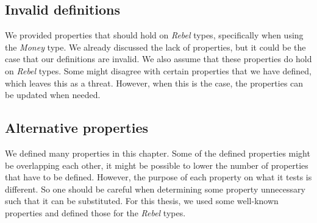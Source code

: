 \subsection*{Invalid definitions}
We provided properties that should hold on \textit{Rebel} types, specifically
when using the \textit{Money} type. We already discussed the lack of properties,
but it could be the case that our definitions are invalid. We also assume that
these properties do hold on \textit{Rebel} types. Some might disagree with
certain properties that we have defined, which leaves this as a threat. However,
when this is the case, the properties can be updated when needed.

\subsection*{Alternative properties}
We defined many properties in this chapter. Some of the defined properties
might be overlapping each other, it might be possible to lower the number of
properties that have to be defined. However, the purpose of each property on
what it tests is different. So one should be careful when determining some
property unnecessary such that it can be substituted. For this thesis, we used
some well-known properties and defined those for the \textit{Rebel} types.
